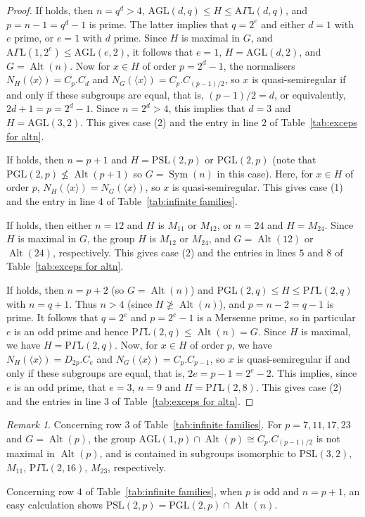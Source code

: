 \documentclass{article}
\theoremstyle{remark}
\newtheorem{rem}[thm]{Remark}
\theoremstyle{definition}
\DeclareMathOperator{\Alt}{Alt}
\DeclareMathOperator{\Sym}{Sym}
\newcommand{\AGL}{\mathrm{AGL}}
\newcommand{\PGL}{\mathrm{PGL}}
\newcommand{\PSL}{\mathrm{PSL}}
\newcommand{\qsr}{quasi-semiregular}
\newcommand{\la}{\langle}
\newcommand{\ra}{\rangle}
\begin{document}
\begin{proof}
If \cite[Theorem 1.2(2)(a)]{Jones} holds, then $n=q^d>4$, $\AGL(d,q)\leqslant H\leqslant \mathrm A\Gamma \mathrm
 L(d,q)$, and $p=n-1=q^d-1$ is prime. The latter implies that $q=2^e$ and  either $d=1$ with $e$  prime, or $e=1$ with $d$ prime. Since $H$ is maximal in $G$, and $\mathrm A\Gamma \mathrm
 L(1,2^e) \leqslant \AGL(e,2)$, it follows that $e=1$,   $H=\AGL(d,2)$, and  $ G = \Alt(n)$. Now for $x\in H$ of order $p=2^d-1$, the normalisers $N_H(\langle x \rangle) = C_p.C_d$ and $N_G(\la x \ra) = C_p.C_{(p-1)/2}$, so $x$ is {\qsr} if and only if these subgroups are equal, that is, $(p-1)/2 = d$, or equivalently, $2d+1=p=2^d-1$. Since $n=2^d>4$, this implies that $d=3$ and $H =\AGL(3,2)$. This gives case (2) and the entry in line $2$ of Table~\ref{tab:exceps for altn}.

If \cite[Theorem 1.2(2)(b)]{Jones} holds, then $n=p+1$ and $H=\PSL(2,p)$ or $\PGL(2,p)$ (note that $\PGL(2,p)\nleqslant \Alt(p+1)$ so $G=\Sym(n)$ in this case). Here, for $x\in H$ of order $p$,  $N_H(\langle x\rangle) = N_G(\langle x\rangle)$, so $x$ is {\qsr}. This gives case (1) and the entry in line 4 of Table~\ref{tab:infinite families}.

If \cite[Theorem 1.2(2)(c)]{Jones}  holds, then either $n=12$ and $H$ is $M_{11}$ or  $M_{12}$,  or $n=24$ and $H=M_{24}$. Since $H$ is maximal in $G$, the group $H$ is $M_{12}$ or $M_{24}$, and $G=\Alt(12)$ or $\Alt(24)$, respectively. This gives case (2) and the entries in lines  $5$ and $8$ of Table~\ref{tab:exceps for altn}.

If \cite[Theorem 1.2(3)]{Jones} holds, then $n=p+2$ (so $G=\Alt(n)$) and $\PGL(2,q) \leqslant H \leqslant \mathrm{P}\Gamma \mathrm{L}(2,q)$ with $n=q+1$. Thus $n>4$ (since $H\not\geqslant\Alt(n)$), and $p=n-2 = q-1$ is prime. It follows that $q=2^e$ and $p=2^e-1$ is a Mersenne prime, so in particular $e$ is an odd prime  and hence $\mathrm{P}\Gamma \mathrm{L}(2,q)\leqslant \Alt(n)=G$. Since $H$ is maximal, we have $H=\mathrm{P}\Gamma \mathrm{L}(2,q)$.  Now, for $x\in H$ of order $p$, we have $N_H(\langle x \rangle) = D_{2p} . C_e$ and $N_G(\langle x \rangle) = C_p.C_{p-1}$, so $x$ is {\qsr} if and only if these subgroups are equal, that is, $2e=p-1 = 2^e-2$. This implies, since $e$ is an odd prime, that $e=3$,   $n=9$ and $H=\mathrm{P}\Gamma\mathrm{L}(2,8)$. This gives case (2) and the entries in line  $3$ of Table~\ref{tab:exceps for altn}.
\end{proof}

\begin{rem} Concerning row $3$ of Table~\ref{tab:infinite families}. For $p = 7,11,17,23$ and $G=\Alt(p)$, the group $\AGL(1,p) \cap \Alt(p) \cong C_p.C_{(p-1)/2}$ is not maximal in $\Alt(p)$, and is contained in subgroups isomorphic to $\PSL(3,2)$, $M_{11}$, $\mathrm P \Gamma \mathrm L(2,16)$, $M_{23}$, respectively.

    Concerning row $4$ of Table~\ref{tab:infinite families}, when $p$ is odd and $n=p+1$, an easy calculation shows  $\PSL(2,p)=\PGL(2,p) \cap \Alt(n)$.
\end{rem}
\end{document}
